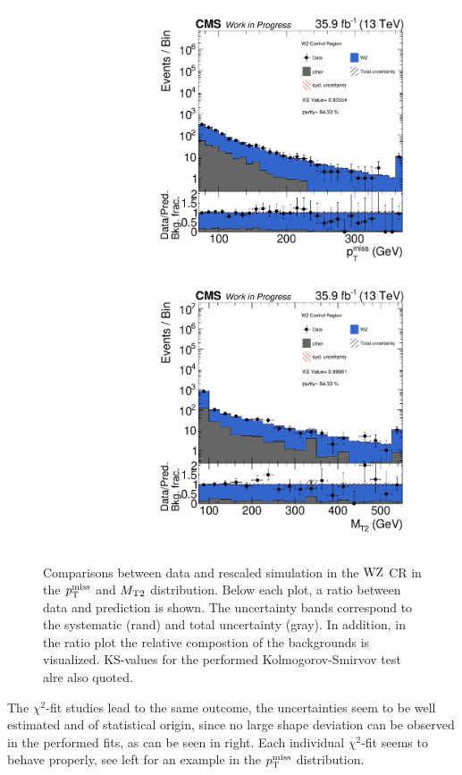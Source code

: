 \begin{figure}[tbp]
 \centering
 \includegraphics[width=\pairwidth]{figures/plots_CR_wz/CRWZ_LL_nom_met_log}
 \includegraphics[width=\pairwidth]{figures/plots_CR_wz/CRWZ_LL_nom_mt2_log}
 \caption{Comparisons between data and rescaled simulation in the $\mathrm{W}\mathrm{Z}$ CR in the $p_{\mathrm{T}}^\text{miss}$ and $M_{\mathrm{T2}}$ distribution. Below each plot, a ratio between data and prediction is shown. The uncertainty bands correspond to the systematic (rand) and total uncertainty (gray). In addition, in the ratio plot the relative compostion of the backgrounds is visualized. KS-values for the performed Kolmogorov-Smirvov test alre also quoted.}
 \label{fig:CRWZ}
\end{figure}
The $\chi^2$-fit studies lead to the same outcome, the uncertainties seem to be well estimated and of statistical origin, since no large shape deviation can be observed in the performed fits, as can be seen in  right. Each individual $\chi^2$-fit seems to behave properly, see  left for an example in the $p_{\mathrm{T}}^\text{miss}$ distribution.

